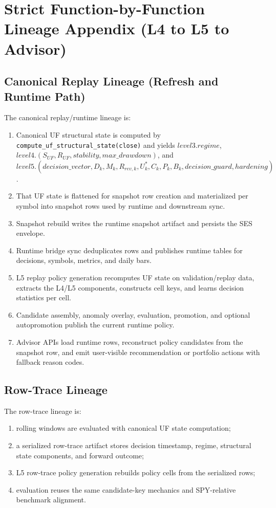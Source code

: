 \chapter{Strict Function-by-Function Lineage Appendix (L4 to L5 to Advisor)}
\section{Canonical Replay Lineage (Refresh and Runtime Path)}

The canonical replay/runtime lineage is:
\begin{enumerate}[leftmargin=1.2cm]
    \item Canonical UF structural state is computed by \texttt{compute\_uf\_structural\_state(close)} and yields $level3.regime$, $level4.(S_{UF},R_{UF},stability,max\_drawdown)$, and $level5.(decision\_vector,D_k,M_k,R_{rev,k},U_k^{\ast},C_k,P_k,B_k,decision\_guard,hardening)$.
    \item That UF state is flattened for snapshot row creation and materialized per symbol into snapshot rows used by runtime and downstream sync.
    \item Snapshot rebuild writes the runtime snapshot artifact and persists the SES envelope.
    \item Runtime bridge sync deduplicates rows and publishes runtime tables for decisions, symbols, metrics, and daily bars.
    \item L5 replay policy generation recomputes UF state on validation/replay data, extracts the L4/L5 components, constructs cell keys, and learns decision statistics per cell.
    \item Candidate assembly, anomaly overlay, evaluation, promotion, and optional autopromotion publish the current runtime policy.
    \item Advisor APIs load runtime rows, reconstruct policy candidates from the snapshot row, and emit user-visible recommendation or portfolio actions with fallback reason codes.
\end{enumerate}

\section{Row-Trace Lineage}
The row-trace lineage is:
\begin{enumerate}[leftmargin=1.2cm]
    \item rolling windows are evaluated with canonical UF state computation;
    \item a serialized row-trace artifact stores decision timestamp, regime, structural state components, and forward outcome;
    \item L5 row-trace policy generation rebuilds policy cells from the serialized rows;
    \item evaluation reuses the same candidate-key mechanics and SPY-relative benchmark alignment.
\end{enumerate}

